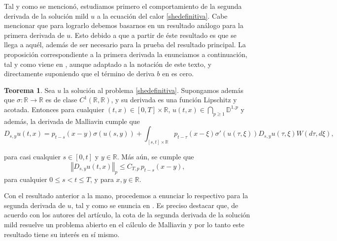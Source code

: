 \documentclass[letterpaper,twoside,12pt]{book}
\newcommand{\R}{\mathbb{R}}
\newcommand{\D}{\mathbb{D}}
\newcommand{\1}{\mathds{1}}
\renewcommand{\to}{\rightarrow}
\newcommand{\norm}[1]{\left\Vert #1 \right\Vert}
\theoremstyle{definition}
\theoremstyle{definition}
\newtheorem{teo}{Teorema}
\theoremstyle{remark}
\theoremstyle{definition}
\theoremstyle{definition}
\theoremstyle{definition}
\theoremstyle{definition}
\theoremstyle{definition}
\begin{document}
Tal y como se mencionó, estudiamos primero el comportamiento de la segunda derivada de la solución mild $u$ a la ecuación del calor \eqref{shedefinitiva}. Cabe mencionar que para lograrlo debemos basarnos en un resultado análogo para la primera derivada de $u$. Esto debido a que a partir de éste resultado es que se llega a aquél, además de ser necesario para la prueba del resultado principal. La proposición correspondiente a la primera derivada la enunciamos a continuación, tal y como viene en \cite[proposición 5.1]{Nualart2007}, aunque adaptado a la notación de este texto, y directamente suponiendo que el término de deriva $b$ en \cite{Nualart2007} es cero.

\begin{teo}\label{teocota1eraderivada}
   Sea $u$ la solución al problema \eqref{shedefinitiva}. Supongamos además que $\sigma:\R\to\R$ es de clase $C^1(\R,\R)$, y su derivada es una función Lipschitz y acotada. Entonces para cualquier $(t,x)\in [0,T]\times\R$, $u(t,x)\in\bigcap_{p\geq1}\D^{1,p}$ y además, la derivada de Malliavin cumple que 
   \begin{equation}\label{formula1eraderivada}
      D_{s,y}u(t,x)=p_{t-s}(x-y)\sigma(u(s,y))+ \int_{[s,t]\times\R} p_{t-\tau}(x-\xi)\sigma'(u(\tau,\xi))D_{s,y}u(\tau,\xi)W(d\tau,d\xi),
   \end{equation}
   
   para casi cualquier $s\in [0,t]$ y $y\in \R$. Más aún, se cumple que 
   \begin{equation}\label{cota1eraderivada} 
      \norm{D_{s,y}u(t,x)}_{p}\leq C_{T,p \ }p_{t-s}(x-y),
   \end{equation}
   para cualquier $0\leq s<t\leq T$, y para $x,y\in \R$.
 \end{teo}
Con el resultado anterior a la mano, procedemos a enunciar lo respectivo para la segunda derivada de $u$, tal y como se enuncia en \cite{KUZGUN202268}. Es preciso destacar que, de acuerdo con los autores del artículo, la cota de la segunda derivada de la solución mild resuelve un problema abierto en el cálculo de Malliavin y por lo tanto este resultado tiene su interés en sí mismo.
\end{document}
